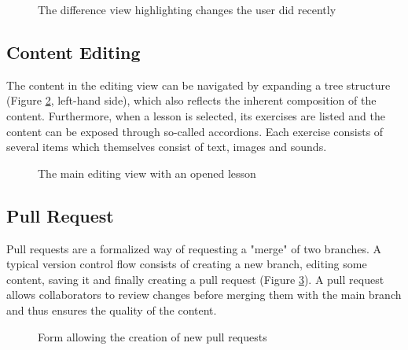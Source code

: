 \begin{figure}[h!]
 \centering
 \caption{The difference view highlighting changes the user did recently}
 \label{fig:unsaved-changes}
\end{figure}

\subsection{Content Editing}
The content in the editing view can be navigated by expanding a tree structure (Figure \ref{fig:prot-initial-editor-view}, left-hand side), which also reflects the inherent composition of the content. Furthermore, when a lesson is selected, its exercises are listed and the content can be exposed through so-called accordions. Each exercise consists of several items which themselves consist of text, images and sounds.

\begin{figure}[h!]
 \centering
 \caption{The main editing view with an opened lesson}
 \label{fig:prot-initial-editor-view}
\end{figure}

\subsection{Pull Request}
Pull requests are a formalized way of requesting a "merge" of two branches. A typical version control flow consists of creating a new branch, editing some content, saving it and finally creating a pull request (Figure \ref{fig:open-new-pr}). A pull request allows collaborators to review changes before merging them with the main branch and thus ensures the quality of the content.

\begin{figure}[h!]
 \centering
 \caption{Form allowing the creation of new pull requests}
 \label{fig:open-new-pr}
\end{figure}




